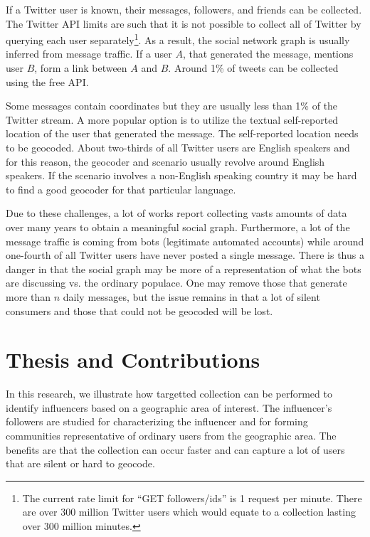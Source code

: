 If a Twitter user is known, their messages, followers, and friends can be collected. The Twitter API limits are such that it is not possible to collect all of Twitter by querying each user separately\footnote{The current rate limit for “GET followers/ids” is 1 request per minute. There are over 300 million Twitter users which would equate to a collection lasting over 300 million minutes.}. As a result, the social network graph is usually inferred from message traffic. If a user $A$, that generated the message, mentions user $B$, form a link between $A$ and $B$. Around 1\% of tweets can be collected using the free API.

Some messages contain coordinates but they are usually less than 1\% of the Twitter stream. %
A more popular option is to utilize the textual self-reported location of the user that generated the message. The self-reported location needs to be geocoded. About two-thirds of all Twitter users are English speakers and for this reason, the geocoder and scenario usually revolve around English speakers. If the scenario involves a non-English speaking country it may be hard to find a good geocoder for that particular language.

Due to these challenges, a lot of works report collecting vasts amounts of data over many years to obtain a meaningful social graph. Furthermore, a lot of the message traffic is coming from bots (legitimate automated accounts) while around one-fourth of all Twitter users have never posted a single message. There is thus a danger in that the social graph may be more of a representation of what the bots are discussing vs. the ordinary populace. One may remove those that generate more than $n$ daily messages, but the issue remains in that a lot of silent consumers and those that could not be geocoded will be lost.

\section{Thesis and Contributions}

In this research, we illustrate how targetted collection can be performed to identify influencers based on a geographic area of interest. The influencer’s followers are studied for characterizing the influencer and for forming communities representative of ordinary users from the geographic area. The benefits are that the collection can occur faster and can capture a lot of users that are silent or hard to geocode. 

